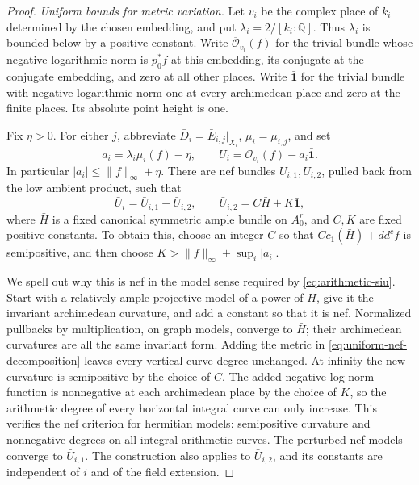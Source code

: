 \begin{proof}
\emph{Uniform bounds for metric variation.}
Let \(v_i\) be the complex place of \(k_i\) determined by the chosen
embedding, and put \(\lambda_i=2/[k_i:\mathbb Q]\).  Thus
\(\lambda_i\) is bounded below by a positive constant.  Write
\(\overline{\mathcal O}_{v_i}(f)\) for the trivial bundle whose negative
logarithmic norm is \(p_0^*f\) at this embedding, its conjugate at the
conjugate embedding, and zero at all other places.  Write
\(\bar{\mathbf 1}\) for the trivial bundle with negative logarithmic
norm one at every archimedean place and zero at the finite places.
Its absolute point height is one.

Fix \(\eta>0\).  For either \(j\), abbreviate
\(\bar D_i=\bar E_{i,j}|_{X_i}\), \(\mu_i=\mu_{i,j}\), and set
\[
 a_i=\lambda_i\mu_i(f)-\eta,\qquad
 \bar U_i=\overline{\mathcal O}_{v_i}(f)-a_i\bar{\mathbf 1}.
\]
In particular \(|a_i|\le\|f\|_\infty+\eta\).  There are nef bundles
\(\bar U_{i,1},\bar U_{i,2}\), pulled back from the low ambient product,
such that
\begin{equation}\label{eq:uniform-nef-decomposition}
 \bar U_i=\bar U_{i,1}-\bar U_{i,2},\qquad
 \bar U_{i,2}=C\bar H+K\bar{\mathbf 1},
\end{equation}
where \(\bar H\) is a fixed canonical symmetric ample bundle on
\(A_0^r\), and \(C,K\) are fixed positive constants.  To obtain this,
choose an integer \(C\) so that
\(C c_1(\bar H)+dd^cf\) is semipositive, and then choose
\(K>\|f\|_\infty+\sup_i|a_i|\).

We spell out why this is nef in the model sense required by
\eqref{eq:arithmetic-siu}.  Start with a relatively ample projective model
of a power of \(H\), give it the invariant archimedean curvature, and
add a constant so that it is nef.  Normalized pullbacks by multiplication,
on graph models, converge to \(\bar H\); their archimedean curvatures
are all the same invariant form.  Adding the metric in
\eqref{eq:uniform-nef-decomposition} leaves every vertical curve degree
unchanged. At infinity the new curvature is semipositive by the choice
of \(C\). The added negative-log-norm function is nonnegative at each
archimedean place by the choice of \(K\), so the arithmetic degree of
every horizontal integral curve can only increase. This verifies the
nef criterion for hermitian models: semipositive curvature and
nonnegative degrees on all integral arithmetic curves. The perturbed
nef models converge to \(\bar U_{i,1}\).
The construction also applies to \(\bar U_{i,2}\), and its constants
are independent of \(i\) and of the field extension.


\end{proof}

